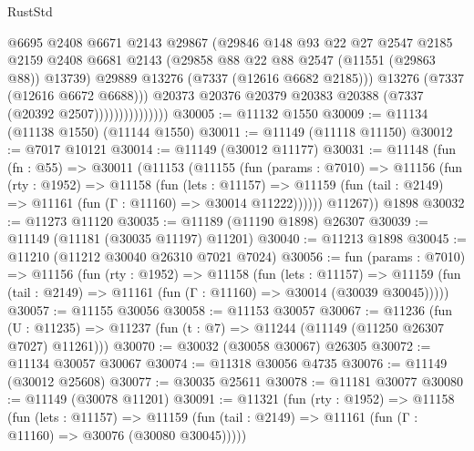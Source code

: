 \begin{lexlean}{RustStd}
\begin{coremodule}
                                @6695
                                @2408
                                @6671
                                @2143
                                @29867
                                (@29846
                                  @148
                                  @93
                                  @22
                                  @27
                                  @2547
                                  @2185
                                  @2159
                                  @2408
                                  @6681
                                  @2143
                                  (@29858 @88 @22 @88 @2547 (@11551 (@29863 @88)) @13739)
                                  @29889
                                  @13276
                                  (@7337 (@12616 @6682 @2185)))
                                @13276
                                (@7337 (@12616 @6672 @6688)))
                              @20373
                              @20376
                              @20379
                              @20383
                              @20388
                              (@7337 (@20392 @2507)))))))))))))))
@30005 := @11132 @1550
@30009 := @11134 (@11138 @1550) (@11144 @1550)
@30011 := @11149 (@11118 @11150)
@30012 := @7017 @10121
@30014 := @11149 (@30012 @11177)
@30031 := @11148
    (fun (fn : @55) =>
    @30011
      (@11153
        (@11155
          (fun (params : @7010) =>
          @11156
            (fun (rty : @1952) =>
            @11158
              (fun (lets : @11157) =>
              @11159 (fun (tail : @2149) => @11161 (fun (Γ : @11160) => @30014 @11222))))))
        @11267))
    @1898
@30032 := @11273 @11120
@30035 := @11189 (@11190 @1898) @26307
@30039 := @11149 (@11181 (@30035 @11197) @11201)
@30040 := @11213 @1898
@30045 := @11210 (@11212 @30040 @26310 @7021 @7024)
@30056 := fun (params : @7010) =>
  @11156
    (fun (rty : @1952) =>
    @11158
      (fun (lets : @11157) =>
      @11159 (fun (tail : @2149) => @11161 (fun (Γ : @11160) => @30014 (@30039 @30045)))))
@30057 := @11155 @30056
@30058 := @11153 @30057
@30067 := @11236
    (fun (U : @11235) => @11237 (fun (t : @7) => @11244 (@11149 (@11250 @26307 @7027) @11261)))
@30070 := @30032 (@30058 @30067) @26305
@30072 := @11134 @30057 @30067
@30074 := @11318 @30056 @4735
@30076 := @11149 (@30012 @25608)
@30077 := @30035 @25611
@30078 := @11181 @30077
@30080 := @11149 (@30078 @11201)
@30091 := @11321
    (fun (rty : @1952) =>
    @11158
      (fun (lets : @11157) =>
      @11159 (fun (tail : @2149) => @11161 (fun (Γ : @11160) => @30076 (@30080 @30045)))))

\end{coremodule}
\end{lexlean}

